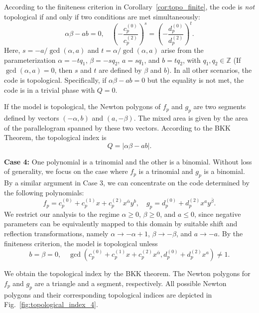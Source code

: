 \documentclass[aps,prb,english,superscriptaddress,twocolumn,tightenlines,showpacs,longbibliography,floatfix,amsfonts]{revtex4-2}
\begin{document}
According to the finiteness criterion in Corollary~\ref{cor:topo_finite}, the code is \emph{not} topological if and only if two conditions are met simultaneously: 
\begin{equation}
    \alpha\beta-ab=0,\quad\left(-\frac{c^{(0)}_p}{c^{(2)}_p}\right)^{s}=\left(-\frac{d^{(0)}_p}{d^{(2)}_p}\right)^{t}.
\end{equation}
Here, $s=-a/\gcd(\alpha,a)$ and $ t=\alpha/\gcd(\alpha,a)$ arise from the parameterization $\alpha=-tq_1$, $\beta=-sq_2$, $a=sq_1$, and $b=tq_2$, with $q_1, q_2 \in \mathbb{Z}$ (If $\gcd(\alpha,a)=0$, then $s$ and $t$ are defined by $\beta$ and $b$). In all other scenarios, the code is topological. Specifically, if $\alpha\beta-ab=0$ but the equality is not met, the code is in a trivial phase with $Q=0$.

If the model is topological, the Newton polygons of $f_p$ and $g_p$ are two segments defined by vectors $(-\alpha,b)$ and $(a,-\beta)$. The mixed area is given by the area of the parallelogram spanned by these two vectors. According to the BKK Theorem, the topological index is
\begin{equation}
    Q=|\alpha\beta-ab|.
\end{equation}
  
\textbf{Case 4: } One polynomial is a trinomial and the other is a binomial. Without loss of generality, we focus on the case where $f_p$ is a trinomial and $g_p$ is a binomial. By a similar argument in Case 3, we can concentrate on the code determined by the following polynomials:
\begin{equation}
    f_p=c^{(0)}_p+c^{(1)}_px+c^{(2)}_px^{\bar{\alpha}}y^b,\quad  g_p=d^{(0)}_p+d^{(2)}_px^ay^{\bar{\beta}}.\label{eq:bi-trinomial_case}
\end{equation}
We restrict our analysis to the regime $\alpha \ge 0$, $\beta \ge 0$, and $a \le 0$, since negative parameters can be equivalently mapped to this domain by suitable shift and reflection transformations, namely $\alpha \to -\alpha + 1$, $\beta \to -\beta$, and $a \to -a$. By the finiteness criterion, the model is topological unless
\begin{equation}
    b=\beta=0,\quad\gcd(c^{(0)}_p+c^{(1)}_px+c^{(2)}_px^{\bar{\alpha}}, d^{(0)}_p+d^{(2)}_px^a)\ne 1.
\end{equation}

We obtain the topological index by the BKK theorem. The Newton polygons for $f_p$ and $g_p$ are a triangle and a segment, respectively. All possible Newton polygons and their corresponding topological indices are depicted in Fig.~\ref{fig:topological_index_4}.
  
\end{document}
